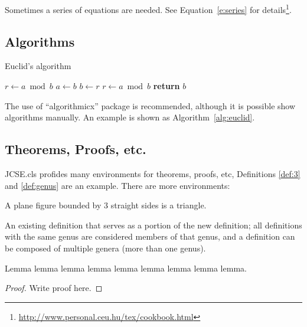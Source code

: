 \documentclass{jcse}
\begin{document}
Sometimes a series of equations are needed.
See Equation~\ref{e:series} for
details\footnote{\url{http://www.personal.ceu.hu/tex/cookbook.html}}.


\subsection{Algorithms}

\begin{algorithm}
\caption{Euclid’s algorithm}\label{alg:euclid}
\begin{algorithmic}[1]
	\State $r\gets a\bmod b$
		\State $a\gets b$
		\State $b\gets r$
		\State $r\gets a\bmod b$
	\EndWhile\label{euclidendwhile}
	\State \textbf{return} $b$
\EndProcedure
\end{algorithmic}
\end{algorithm}

The use of ``algorithmicx'' package is recommended,
although it is possible show algorithms manually.
An example is shown as Algorithm~\ref{alg:euclid}.


\subsection{Theorems, Proofs, etc.} \label{s:envs}

JCSE.cls profides many environments for theorems, proofs, etc,
Definitions \ref{def:3} and \ref{def:genus} are an example.
There are more environments:

\begin{definition}[A triangle]
\label{def:3}
A plane figure bounded by 3 straight sides is a triangle.
\end{definition}

\begin{definition}
\label{def:genus}
An existing definition that serves as a portion of the new definition;
all definitions with the same genus are considered members of that genus,
and a definition can be composed of multiple genera (more than one genus).
\end{definition}

\begin{lemma}
Lemma lemma lemma lemma lemma lemma lemma lemma lemma.
\end{lemma}
\begin{proof}
Write proof here.
\end{proof}
\end{document}
